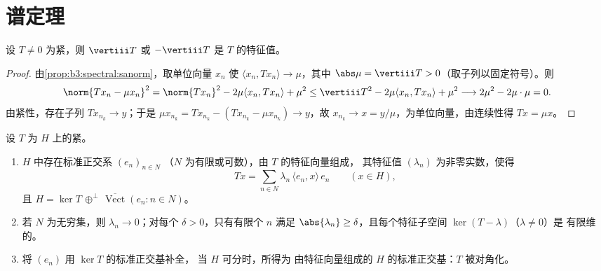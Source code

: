 \section{谱定理}

\begin{lemma}[存在极端特征值]
\label{lem:b3:spectral:existence}
设 $T \neq 0$ 为紧，则 $\vertiii T$
或 $-\vertiii T$ 是 $T$ 的特征值。
\end{lemma}

\begin{proof}
由\cref{prop:b3:spectral:sanorm}，取单位向量 $x_n$
使 $\langle x_n, Tx_n\rangle \to \mu$，其中 $\abs\mu =
\vertiii T > 0$（取子列以固定符号）。则
\[
\norm{Tx_n - \mu x_n}^2
= \norm{Tx_n}^2 - 2\mu\langle x_n, Tx_n\rangle + \mu^2
\leq \vertiii T^2 - 2\mu\langle x_n, Tx_n\rangle + \mu^2
\longrightarrow 2\mu^2 - 2\mu\cdot\mu = 0 .
\]
由紧性，存在子列 $Tx_{n_k} \to y$；于是 $\mu
x_{n_k} = Tx_{n_k} - (Tx_{n_k} - \mu x_{n_k}) \to y$，故
$x_{n_k} \to x = y/\mu$，为单位向量，由连续性得
$Tx = \mu x$。
\end{proof}

\begin{theorem}[紧自伴算子的谱定理
]\label{thm:b3:spectral:spectral}
设 $T$ 为
$H$ 上的紧。
\begin{enumerate}
  \item $H$ 中存在标准正交系 $(e_n)_{n \in N}$
        （$N$ 为有限或可数），由 $T$ 的特征向量组成，
        其特征值 $(\lambda_n)$ 为非零实数，使得
        \[
        Tx = \sum_{n\in N}\lambda_n\,\langle e_n, x\rangle\,
        e_n \qquad (x \in H),
        \]
        且 $H = \ker T \,\oplus^\perp\,
        \overline{\operatorname{Vect}}(e_n : n \in N)$。
  \item 若 $N$ 为无穷集，则 $\lambda_n \to 0$；对每个
        $\delta > 0$，只有有限个 $n$ 满足
        $\abs{\lambda_n} \geq \delta$，且每个特征子空间
        $\ker(T - \lambda)$（$\lambda \neq 0$）是
        有限维的。
  \item 将 $(e_n)$ 用 $\ker T$ 的标准正交基补全，
        当 $H$ 可分时，所得为
        由特征向量组成的 $H$ 的标准正交基：$T$ 被对角化。
\end{enumerate}
\end{theorem}


